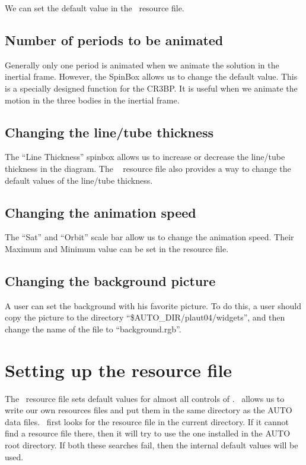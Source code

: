 We can set the default value in the \PLAUT~resource file.

\subsection{Number of periods to be animated}

Generally only one period is animated when we animate the solution in the inertial frame.
However, the SpinBox allows us to change the default value. 
 This is a specially designed function for the CR3BP. 
It is useful when  we animate the motion in the three bodies in the inertial frame.

\subsection{Changing the line/tube thickness}

The ``Line Thickness'' spinbox allows us to increase or decrease the line/tube thickness
in the diagram.  The \PLAUT~ resource file also provides a way to change the default values of the
line/tube thickness.

\subsection{Changing the animation speed}

The ``Sat'' and ``Orbit'' scale bar allow us to change the animation speed. 
Their Maximum and Minimum value can be set in the resource file.

\subsection{Changing the background picture}

A user can set the background with his favorite picture. 
To do this, a user should copy the picture to the directory ``\$AUTO\_DIR/plaut04/widgets'', 
and then change the name of the file to ``background.rgb''.

\section{Setting up the resource file}

The \PLAUT~resource file sets default values for 
almost all controls of \PLAUT. 
\PLAUT~allows us to write our own resources files and put them in the same directory as the AUTO data files. 
\PLAUT~first looks for the resource file in the current directory.
If it cannot find a resource file there, then it will try to use the one installed
in the AUTO root directory. If both these searches fail, then the internal
default values will be used.

